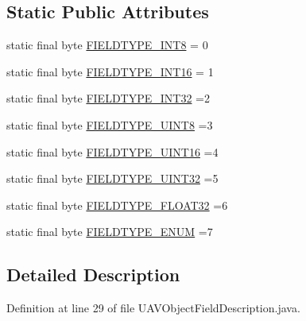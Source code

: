\subsection*{Static Public Attributes}
\begin{DoxyCompactItemize}
\item 
static final byte \hyperlink{classorg_1_1taulabs_1_1uavtalk_1_1_u_a_v_object_field_description_a17612ae29b2cbdd074a6f64afe7d691a}{F\-I\-E\-L\-D\-T\-Y\-P\-E\-\_\-\-I\-N\-T8} = 0
\item 
static final byte \hyperlink{classorg_1_1taulabs_1_1uavtalk_1_1_u_a_v_object_field_description_a5993b8ebf7b63241ec528471d1a05d3b}{F\-I\-E\-L\-D\-T\-Y\-P\-E\-\_\-\-I\-N\-T16} = 1
\item 
static final byte \hyperlink{classorg_1_1taulabs_1_1uavtalk_1_1_u_a_v_object_field_description_a20c83740bd7e11baa49b4e4478c343b9}{F\-I\-E\-L\-D\-T\-Y\-P\-E\-\_\-\-I\-N\-T32} =2
\item 
static final byte \hyperlink{classorg_1_1taulabs_1_1uavtalk_1_1_u_a_v_object_field_description_a35a1cfdb03119d8107d7d16e92821b1b}{F\-I\-E\-L\-D\-T\-Y\-P\-E\-\_\-\-U\-I\-N\-T8} =3
\item 
static final byte \hyperlink{classorg_1_1taulabs_1_1uavtalk_1_1_u_a_v_object_field_description_ab61cb83768196bce3426887af7e1efff}{F\-I\-E\-L\-D\-T\-Y\-P\-E\-\_\-\-U\-I\-N\-T16} =4
\item 
static final byte \hyperlink{classorg_1_1taulabs_1_1uavtalk_1_1_u_a_v_object_field_description_a860d6a63cf30e7aad7c6907e2b45a38c}{F\-I\-E\-L\-D\-T\-Y\-P\-E\-\_\-\-U\-I\-N\-T32} =5
\item 
static final byte \hyperlink{classorg_1_1taulabs_1_1uavtalk_1_1_u_a_v_object_field_description_a59c29169f377d43a9218dda143e9cd2c}{F\-I\-E\-L\-D\-T\-Y\-P\-E\-\_\-\-F\-L\-O\-A\-T32} =6
\item 
static final byte \hyperlink{classorg_1_1taulabs_1_1uavtalk_1_1_u_a_v_object_field_description_a46022d1b3b3ec69ffe09361dae7703a5}{F\-I\-E\-L\-D\-T\-Y\-P\-E\-\_\-\-E\-N\-U\-M} =7
\end{DoxyCompactItemize}


\subsection{Detailed Description}


Definition at line 29 of file U\-A\-V\-Object\-Field\-Description.\-java.



